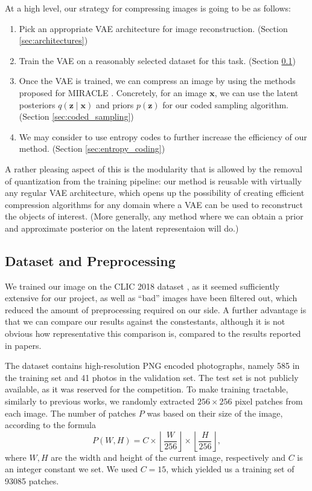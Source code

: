 \documentclass{article}
\renewcommand{\vec}[1]{\mathbf{#1}}
\begin{document}
At a high level, our strategy for compressing images is going to be as follows:

\begin{enumerate}
\item Pick an appropriate VAE architecture for image reconstruction. (Section
  \ref{sec:architectures})
\item Train the VAE on a reasonably selected dataset for this task. (Section
  \ref{sec:dataset_preproc})
\item Once the VAE is trained, we can compress an image by using the methods
  proposed for MIRACLE \cite{havasi2018minimal}. Concretely, for an image
  $\vec{x}$, we can use the latent posteriors $q(\vec{z} \mid \vec{x})$ and
  priors $p(\vec{z})$ for our coded sampling algorithm. (Section
  \ref{sec:coded_sampling})
\item We may consider to use entropy codes to further increase the efficiency of
  our method. (Section \ref{sec:entropy_coding})
\end{enumerate}

\par
A rather pleasing aspect of this is the modularity that is allowed by the
removal of quantization from the training pipeline: our method is reusable with
virtually any regular VAE architecture, which opens up the possibility of
creating efficient compression algorithms for any domain where a VAE can be used
to reconstruct the objects of interest. (More generally, any method where we
can obtain a prior and approximate posterior on the latent representaion will do.)

\subsection{Dataset and Preprocessing}
\label{sec:dataset_preproc}
\par
We trained our image on the CLIC 2018 dataset \cite{clic2018}, as it seemed
sufficiently extensive for our project, as well as ``bad'' images have been
filtered out, which reduced the amount of preprocessing required on our side.
A further advantage is that we can compare our results against the constestants,
although it is not obvious how representative this comparison is, compared to
the results reported in papers.
\par
The dataset contains high-resolution PNG encoded photographs, namely 585 in the
training set and 41 photos in the validation set. The test set is not
publicly available, as it was reserved for the competition. 
To make training tractable, similarly to previous works, we randomly extracted
$256 \times 256$ pixel patches from each image. The number of patches $P$ was
based on their size of the image, according to the formula
\[
  P(W, H) = C \times \left \lfloor \frac{W}{256} \right \rfloor \times
  \left \lfloor \frac{H}{256} \right \rfloor,
\]
where $W, H$ are the width and height of the current image, respectively and $C$
is an integer constant we set. We used $C = 15$, which yielded us a training set
of 93085 patches.
\end{document}
